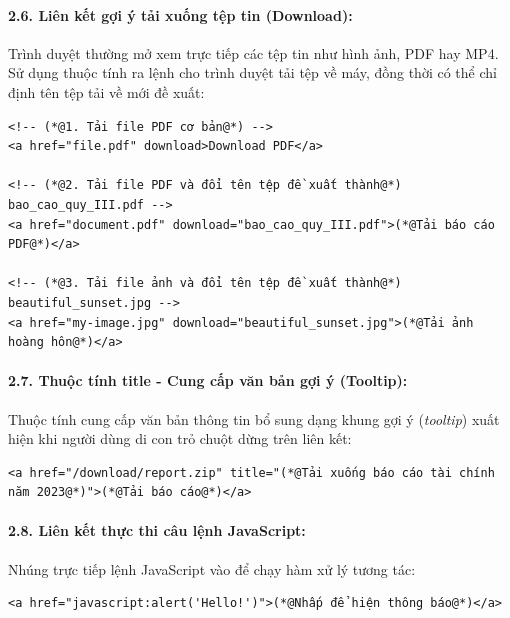 \paragraph{2.6. Liên kết gợi ý tải xuống tệp tin (Download):}
Trình duyệt thường mở xem trực tiếp các tệp tin như hình ảnh, PDF hay MP4. Sử dụng thuộc tính  ra lệnh cho trình duyệt tải tệp về máy, đồng thời có thể chỉ định tên tệp tải về mới đề xuất:

\begin{codeWindow}
\begin{lstlisting}[language=HTML5]
<!-- (*@1. Tải file PDF cơ bản@*) -->
<a href="file.pdf" download>Download PDF</a>

<!-- (*@2. Tải file PDF và đổi tên tệp đề xuất thành@*) bao_cao_quy_III.pdf -->
<a href="document.pdf" download="bao_cao_quy_III.pdf">(*@Tải báo cáo PDF@*)</a>

<!-- (*@3. Tải file ảnh và đổi tên tệp đề xuất thành@*) beautiful_sunset.jpg -->
<a href="my-image.jpg" download="beautiful_sunset.jpg">(*@Tải ảnh hoàng hôn@*)</a>
\end{lstlisting}
\end{codeWindow}

\paragraph{2.7. Thuộc tính title - Cung cấp văn bản gợi ý (Tooltip):}
Thuộc tính  cung cấp văn bản thông tin bổ sung dạng khung gợi ý (\textit{tooltip}) xuất hiện khi người dùng di con trỏ chuột dừng trên liên kết:

\begin{codeWindow}
\begin{lstlisting}[language=HTML5]
<a href="/download/report.zip" title="(*@Tải xuống báo cáo tài chính năm 2023@*)">(*@Tải báo cáo@*)</a>
\end{lstlisting}
\end{codeWindow}

\paragraph{2.8. Liên kết thực thi câu lệnh JavaScript:}
Nhúng trực tiếp lệnh JavaScript vào  để chạy hàm xử lý tương tác:

\begin{codeWindow}
\begin{lstlisting}[language=HTML5]
<a href="javascript:alert('Hello!')">(*@Nhấp để hiện thông báo@*)</a>
\end{lstlisting}
\end{codeWindow}

